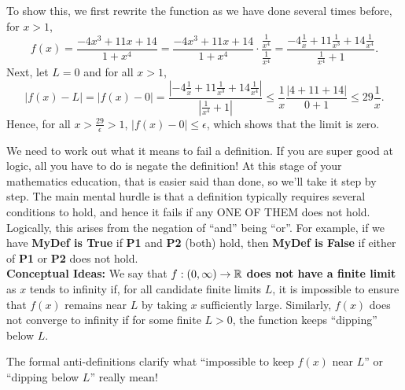 \begin{enumerate}
To show this, we first rewrite the function as we have done several times before, for $x>1$,
$$f(x) = \frac{-4x^3 + 11 x + 14}{1 + x^4} =  \frac{-4x^3 + 11 x + 14}{1 + x^4} \cdot  \frac{\frac{1}{x^4}}{\frac{1}{x^4}} = \frac{-4\frac{1}{x} + 11 \frac{1}{x^3}  + 14 \frac{1}{x^4} }{\frac{1}{x^4} + 1}.$$
Next, let $L=0$ and for all $x>1$, 
$$ |f(x) - L| = |f(x)-0| =  \frac{|-4\frac{1}{x} + 11 \frac{1}{x^3}  + 14 \frac{1}{x^4} |}{|\frac{1}{x^4} + 1|}\le \frac{1}{x} \frac{|4 + 11  + 14  |}{0 + 1} \le  29 \frac{1}{x} . $$
Hence, for all $x > \frac{29}{\epsilon}>1$, $|f(x) -0| \le \epsilon$, which shows that the limit is zero.
\end{enumerate}

\Qed



\bigskip


\begin{tcolorbox}[colback=mylightblue, title = {\bf Neither Finite nor Infinite Limit at $\infty$ Exists}, breakable]

We need to work out what it means to fail a definition. If you are super good at logic, all you have to do is negate the definition! At this stage of your mathematics education, that is easier said than done, so we'll take it step by step. The main mental hurdle is that a definition typically requires several conditions to hold, and hence it fails if any ONE OF THEM does not hold. Logically, this arises from the negation of ``and'' being ``or''. For example, if we have \textbf{MyDef is True} if \textbf{P1} and \textbf{P2} (both) hold, then  \textbf{MyDef is False} if either of \textbf{P1} or \textbf{P2} does not hold. \\

\textbf{Conceptual Ideas:} We say that $f:(0, \infty) \to \mathbb R$ \textbf{does not have a finite limit} as $x$ tends to infinity if, for all candidate finite limits $L$, it is impossible to ensure that $f(x)$ remains near $L$ by taking $x$ sufficiently large. Similarly, $f(x)$ does not converge to infinity if for some finite $L>0$, the function keeps ``dipping'' below $L$. 



\bigskip

The formal anti-definitions clarify what ``impossible to keep $f(x)$ near $L$'' or ``dipping below $L$'' really mean!


\end{tcolorbox}
